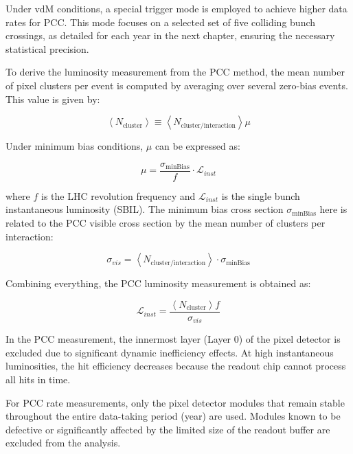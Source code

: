 Under vdM conditions, a special trigger mode is employed to achieve higher data rates for PCC. This mode focuses on a selected set of five colliding bunch crossings, as detailed for each year in the next chapter, ensuring the necessary statistical precision.  

To derive the luminosity measurement from the PCC method, the mean number of pixel clusters per event is computed by averaging over several zero-bias events. This value is given by:

\begin{equation}
\left < N_{\text{cluster}} \right > \equiv \left < N_{\text{cluster}/\text{interaction}} \right > \mu
\end{equation}

Under minimum bias conditions, $\mu$ can be expressed as: 

\begin{equation}
\mu = \frac{\sigma_{\text{minBias}}}{f} \cdot \mathcal{L}_{inst}
\end{equation}

where $f$ is the LHC revolution frequency and $\mathcal{L}_{inst}$ is the single bunch instantaneous luminosity (SBIL). The minimum bias cross section $\sigma_{\text{minBias}}$ here is related to the PCC visible cross section by the mean number of clusters per interaction:

\begin{equation}
\sigma_{vis}= \left < N_{\text{cluster}/\text{interaction}} \right >\cdot \sigma_{\text{minBias}}
\end{equation}

Combining everything, the PCC luminosity measurement is obtained as:

\begin{equation}
\mathcal{L}_{inst}=\frac{\left < N_{\text{cluster}} \right> f}{\sigma_{vis}}
\end{equation}

In the PCC measurement, the innermost layer (Layer 0) of the pixel detector is excluded due to significant dynamic inefficiency effects. At high instantaneous luminosities, the hit efficiency decreases because the readout chip cannot process all hits in time.

For PCC rate measurements, only the pixel detector modules that remain stable throughout the entire data-taking period (year) are used. Modules known to be defective or significantly affected by the limited size of the readout buffer are excluded from the analysis.

